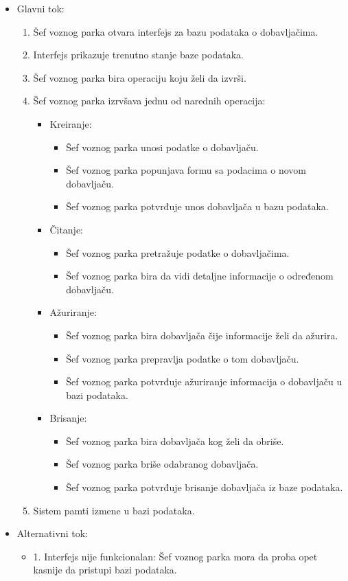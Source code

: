 \begin{itemize}
	\item Glavni tok:
		\begin{enumerate}
		    \item Šef voznog parka otvara interfejs za bazu podataka o dobavljačima.
		    \item Interfejs prikazuje trenutno stanje baze podataka.
		    \item Šef voznog parka bira operaciju koju želi da izvrši.
			\item Šef voznog parka izrvšava jednu od narednih operacija:
			\begin{itemize}
                \item Kreiranje:
                \begin{itemize}
                    \item Šef voznog parka unosi podatke o dobavljaču.
                    \item Šef voznog parka popunjava formu sa podacima o novom dobavljaču.
                    \item Šef voznog parka potvrđuje unos dobavljača u bazu podataka.
                \end{itemize}
                \item Čitanje:
                \begin{itemize}
                    \item Šef voznog parka pretražuje podatke o dobavljačima.
                    \item Šef voznog parka bira da vidi detaljne informacije o određenom dobavljaču.
                \end{itemize}
                \item Ažuriranje:
                \begin{itemize}
                    \item Šef voznog parka bira dobavljača čije informacije želi da ažurira.
                    \item Šef voznog parka prepravlja podatke o tom dobavljaču.
                    \item Šef voznog parka potvrđuje ažuriranje informacija o dobavljaču u bazi podataka.
                \end{itemize}
                \item Brisanje:
                \begin{itemize}
                    \item Šef voznog parka bira dobavljača kog želi da obriše.
                    \item Šef voznog parka briše odabranog dobavljača.
                    \item Šef voznog parka potvrđuje brisanje dobavljača iz baze podataka.
                \end{itemize}
            \end{itemize}
		\item Sistem pamti izmene u bazi podataka.
		\end{enumerate}

	\item Alternativni tok:
		\begin{itemize}
		    \item 1. Interfejs nije funkcionalan: Šef voznog parka mora da proba opet kasnije da pristupi bazi podataka.
		\end{itemize}

\end{itemize}